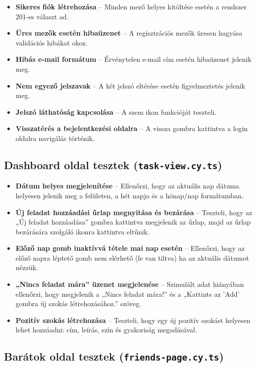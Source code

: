 \documentclass[12pt]{report}
\begin{document}
\begin{itemize}
  \item \textbf{Sikeres fiók létrehozása} – Minden mező helyes kitöltése esetén a rendszer 201-es választ ad.
  \item \textbf{Üres mezők esetén hibaüzenet} – A regisztrációs mezők üresen hagyása validációs hibákat okoz.
  \item \textbf{Hibás e-mail formátum} – Érvénytelen e-mail cím esetén hibaüzenet jelenik meg.
  \item \textbf{Nem egyező jelszavak} – A két jelszó eltérése esetén figyelmeztetés jelenik meg.
  \item \textbf{Jelszó láthatóság kapcsolása} – A szem ikon funkcióját teszteli.
  \item \textbf{Visszatérés a bejelentkezési oldalra} – A vissza gombra kattintva a login oldalra navigálás történik.
\end{itemize}
\subsection{Dashboard oldal tesztek (\texttt{task-view.cy.ts})}

\begin{itemize}
  \item \textbf{Dátum helyes megjelenítése} – Ellenőrzi, hogy az aktuális nap dátuma helyesen jelenik meg a felületen, a hét napja és a hónap/nap formátumban.
  \item \textbf{Új feladat hozzáadási űrlap megnyitása és bezárása} – Teszteli, hogy az „Új feladat hozzáadása” gombra kattintva megjelenik az űrlap, majd az űrlap bezárására szolgáló ikonra kattintva eltűnik.
  \item \textbf{Előző nap gomb inaktívvá tétele mai nap esetén} – Ellenőrzi, hogy az előző napra léptető gomb nem elérhető (le van tiltva) ha az aktuális dátumot nézzük.
  \item \textbf{„Nincs feladat mára” üzenet megjelenése} – Szimulált adat hiányában ellenőrzi, hogy megjelenik a „Nincs feladat mára!” és a „Kattints az 'Add' gombra új szokás létrehozásához.” szöveg.
  \item \textbf{Pozitív szokás létrehozása} – Teszteli, hogy egy új pozitív szokást helyesen lehet hozzáadni: cím, leírás, szín és gyakoriság megadásával.
\end{itemize}
\subsection{Barátok oldal tesztek (\texttt{friends-page.cy.ts})}
\end{document}
